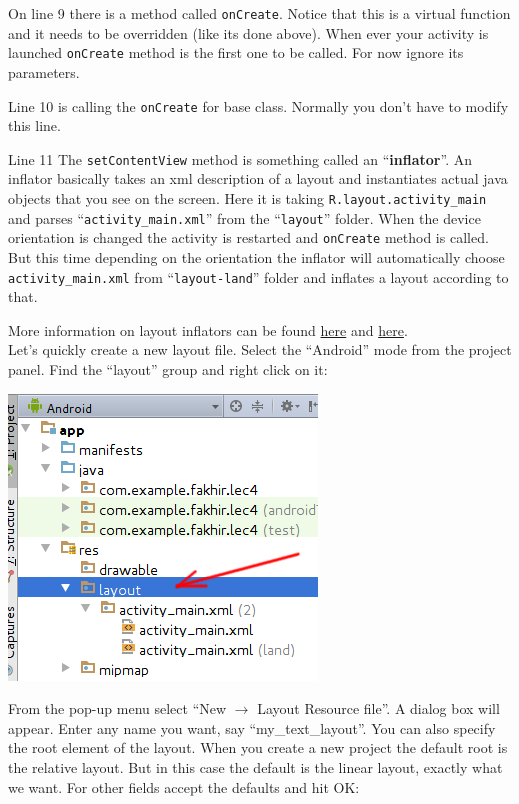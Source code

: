 On line 9 there is a method called \texttt{onCreate}. Notice that this is a virtual function and it needs to be overridden (like its done above). When ever your activity is launched \texttt{onCreate} method is the first one to be called. For now ignore its parameters.

Line 10 is calling the \texttt{onCreate} for base class. Normally you don't have to modify this line.

Line 11 The \texttt{setContentView} method is something called an ``\textbf{inflator}''. An inflator basically takes an xml description of a layout and instantiates actual java objects that you see on the screen. Here it is taking \texttt{R.layout.activity\_main} and parses ``\texttt{activity\_main.xml}'' from the ``\texttt{layout}'' folder. When the device orientation is changed the activity is restarted and \texttt{onCreate} method is called. But this time depending on the orientation the inflator will automatically choose \texttt{activity\_main.xml} from ``\texttt{layout-land}'' folder and inflates a layout according to that. 

More information on layout inflators can be found \href{https://developer.android.com/reference/android/view/LayoutInflater.html}{here} and \href{http://stackoverflow.com/questions/2335813/how-to-inflate-one-view-with-a-layout}{here}. \\

Let's quickly create a new layout file. Select the ``Android'' mode from the project panel. Find the ``layout'' group and right click on it:

\begin{center}
	\includegraphics[scale=0.4]{chapters/ch04/images/39}
\end{center}

From the pop-up menu select ``New $\rightarrow$ Layout Resource file''. A dialog box will appear. Enter any name you want, say ``my\_text\_layout''. You can also specify the root element of the layout. When you create a new project the default root is the relative layout. But in this case the default is the linear layout, exactly what we want. For other fields accept the defaults and hit OK:

